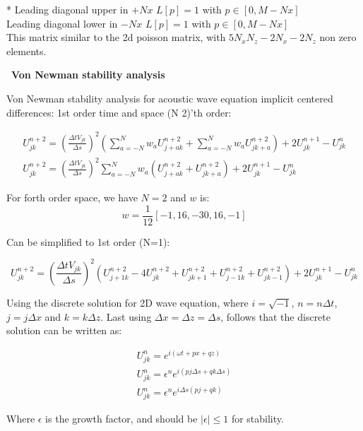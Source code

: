 \documentclass[legalpaper, 12pt]{article}
\begin{document}
* Leading diagonal upper in $+Nx$ $L[p] = 1$ with $p \in [0, M-Nx] $ \\
   Leading diagonal lower in $-Nx$  $L[p] = 1$ with $p \in [0, M-Nx] $ \\
   
This matrix similar to the 2d poisson matrix, with $5N_xN_z-2N_x-2N_z$ non zero elements. 


\newpage

\
\textbf{Von Newman stability analysis}

Von Newman stability analysis for acoustic wave equation implicit centered differences: 1st order time and space (N 2)'th order:


\begin{multline}
U_{jk}^{n+2}  =  \left( \frac{\Delta t  V_{jk} }{\Delta s} \right) ^2 \left(  \sum_{a=-N}^N w_a U_{j+a k}^{n+2} + \sum_{a=-N}^N w_a U_{j k+a}^{n+2} \right) + 2 U_{jk}^{n+1} - U_{jk}^n  \\
U_{jk}^{n+2}  =  \left( \frac{\Delta t  V_{jk}}{\Delta s} \right) ^2  \sum_{a=-N}^N  w_a \left( U_{j+a k}^{n+2} + U_{j k+a}^{n+2} \right) + 2 U_{jk}^{n+1} - U_{jk}^n \label{a6}
\end{multline}

For forth order space, we have $N=2$ and $w$ is:
$$ w = \frac{1}{12} [-1, 16, -30, 16, -1] $$

Can be simplified to 1st order (N=1):

\begin{equation}
U_{jk}^{n+2}  =  \left( \frac{\Delta t  V_{jk}}{\Delta s} \right) ^2 \left(  U_{j+1k}^{n+2} - 4 U_{jk}^{n+2} + U_{jk+1}^{n+2} + U_{j-1k}^{n+2} + U_{jk-1}^{n+2}  \right) + 2 U_{jk}^{n+1} - U_{jk}^{n} \nonumber
\end{equation}


Using the discrete solution for 2D wave equation, where $ i = \sqrt{-1} $, $ n = n \Delta t $, $ j = j \Delta x $ and $ k = k \Delta z $. Last using $ \Delta x = \Delta z = \Delta s $, follows that the discrete solution can be written as:

\begin{eqnarray}
U_{jk}^n = e^{i \left( \omega t + px + qz \right)} \nonumber \\
U_{jk}^n = \epsilon^n e^{i \left( pj\Delta s + qk\Delta s \right)}  \nonumber \\
U_{jk}^n = \epsilon^n e^{i \Delta s \left( pj + qk \right)}  \label{a7}
\end{eqnarray}

Where $\epsilon $ is the growth factor, and should be $ |\epsilon| \leq 1$ for stability. \\
\end{document}
